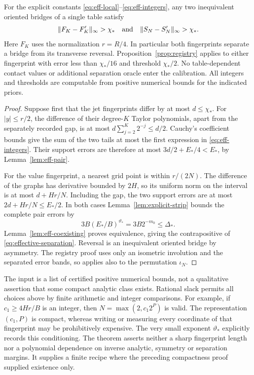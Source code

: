 \begin{theorem}\label{thm:effective}
For the explicit constants \eqref{eq:eff-local}--\eqref{eq:eff-integers},
any two inequivalent oriented bridges of a single table satisfy
\begin{equation}\label{eq:effective-separation}
 \|F_K-F'_K\|_\infty>\chi_*\quad\hbox{and}\quad
 \|S_N-S'_N\|_\infty>\chi_*.
\end{equation}
Here $F_K$ uses the normalization $r=R/4$. In particular both
fingerprints separate a bridge from its transverse reversal.
Proposition~\ref{prop:registry} applies to either fingerprint with
error less than $\chi_*/16$ and threshold $\chi_*/2$.
No table-dependent contact values or additional separation oracle enter
the calibration. All integers and thresholds are computable from positive
numerical bounds for the indicated priors.
\end{theorem}
\begin{proof}
Suppose first that the jet fingerprints differ by at most $d\le\chi_*$.
For $|y|\le r/2$, the difference of their degree-$K$ Taylor
polynomials, apart from the separately recorded gap, is at most
$d\sum_{j=2}^K2^{-j}\le d/2$. Cauchy's coefficient bounds give the
sum of the two tails at most the first expression in
\eqref{eq:eff-integers}. Their support errors are therefore at most
$3d/2+E_*/4<E_*$, by Lemma~\ref{lem:eff-pair}.

For the value fingerprint, a nearest grid point is within $r/(2N)$.
The difference of the graphs has derivative bounded by $2H$, so its
uniform norm on the interval is at most $d+Hr/N$. Including the gap,
the two support errors are at most
$2d+Hr/N\le E_*/2$. In both cases Lemma~\ref{lem:explicit-strip}
bounds the complete pair errors by
\[
 3B(E_*/B)^{\vartheta_*}=3B2^{-m_0}\le\Delta_*.
\]
Lemma~\ref{lem:eff-coexisting} proves equivalence, giving the
contrapositive of \eqref{eq:effective-separation}. Reversal is an
inequivalent oriented bridge by asymmetry. The registry proof uses only
an isometric involution and the separated error bands, so applies also
to the permutation $\iota_N$.
\end{proof}

\begin{remark}\label{rem:effectivity}
The input is a list of certified positive numerical bounds, not a
qualitative assertion that some compact analytic class exists. Rational
slack permits all choices above by finite arithmetic and integer
comparisons. For example, if $c_1\ge4Hr/B$ is an integer, then
$N=\max(2,c_1 2^P)$ is valid. The representation $(c_1,P)$ is compact,
whereas writing or measuring every coordinate of that fingerprint may
be prohibitively expensive. The very small exponent
$\vartheta_*$ explicitly records this conditioning. The theorem asserts
neither a sharp fingerprint length nor a polynomial dependence on inverse
analytic, symmetry or separation margins. It supplies a finite recipe
where the preceding compactness proof supplied existence only.
\end{remark}
